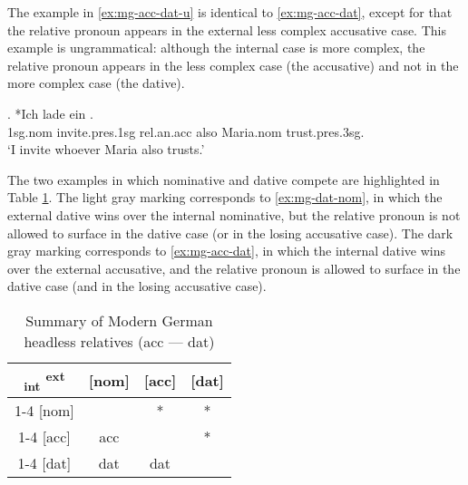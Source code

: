 The example in \ref{ex:mg-acc-dat-u} is identical to \ref{ex:mg-acc-dat}, except for that the relative pronoun appears in the external less complex accusative case. This example is ungrammatical: although the internal case is more complex, the relative pronoun appears in the less complex case (the accusative) and not in the more complex case (the dative).

\exg. *Ich {lade ein}    . \\
1\ac{sg}.\ac{nom} invite.\ac{pres}.1\ac{sg}\scsub{[acc]} \ac{rel}.\ac{an}.\ac{acc} also Maria.\ac{nom} trust.\ac{pres}.3\ac{sg}\scsub{[dat]}.\\
`I invite whoever Maria also trusts.' \label{ex:mg-acc-dat-u}

The two examples in which nominative and dative compete are highlighted in Table \ref{tbl:case-competition-mg-acc-dat}. The light gray marking corresponds to \ref{ex:mg-dat-nom}, in which the external dative wins over the internal nominative, but the relative pronoun is not allowed to surface in the dative case (or in the losing accusative case). The dark gray marking corresponds to \ref{ex:mg-acc-dat}, in which the internal dative wins over the external accusative, and the relative pronoun is allowed to surface in the dative case (and in the losing accusative case).

\begin{table}[H]
  \center
  \caption{Summary of Modern German headless relatives (\ac{acc} --- \ac{dat})}
  \begin{tabular}{c|c|c|c}
    \toprule
    \textsubscript{\ac{int}} \textsuperscript{\ac{ext}}
           & [\ac{nom}]
           & [\ac{acc}]
           & [\ac{dat}]
           \\ \cmidrule{1-4}
       [\ac{nom}]
           & \xcancel{\phantom{xx}}
           & *
           & *
           \\ \cmidrule{1-4}
       [\ac{acc}]
           & \ac{acc}
           & \xcancel{\phantom{xx}}
           & \cellcolor{LG}*
           \\ \cmidrule{1-4}
       [\ac{dat}]
           & \ac{dat}
           & \cellcolor{DG}\ac{dat}
           & \xcancel{\phantom{xx}}
           \\
     \bottomrule
  \end{tabular}
    \label{tbl:case-competition-mg-acc-dat}
\end{table}

